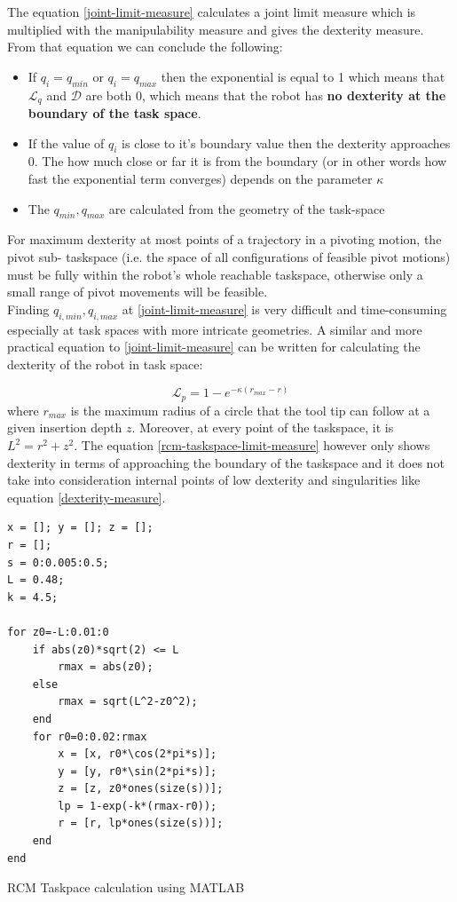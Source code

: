 The equation \ref{joint-limit-measure} calculates a joint limit measure which is multiplied with the manipulability measure and gives the dexterity measure.
From that equation we can conclude the following:
\begin{itemize}
\item If $q_i = q_{min}$ or $q_i = q_{max}$ then the exponential is equal to 1 which means that $\mathcal{L}_{q}$ and $\mathcal{D}$ are both 0, which means 
that the robot has \textbf{no dexterity at the boundary of the task space}.
\item If the value of $q_i$ is close to it's boundary value then the dexterity approaches 0. The how much close or far it is from the boundary (or in other words 
how fast the exponential term converges) depends on the parameter $\kappa$
\item The $q_{min}, q_{max}$ are calculated from the geometry of the task-space
\end{itemize}

For maximum dexterity at most points of a trajectory in a pivoting motion, the pivot sub-
taskspace (i.e. the space of all configurations of feasible pivot motions) must be fully within 
the robot’s whole reachable taskspace, otherwise only a small range of pivot movements will be 
feasible.\\

Finding $q_{i,min}, q_{i,max}$ at \ref{joint-limit-measure} is very difficult and time-consuming especially at task spaces with more intricate geometries. 
A similar and more practical equation to \ref{joint-limit-measure} can be written for calculating the dexterity of the robot in task space:

\begin{equation}
\label{rcm-taskspace-limit-measure}
\mathcal{L}_{p}=1-e^{-\kappa (r_{max} - r)}
\end{equation}
where $r_{max}$ is the maximum radius of a circle that the tool tip can follow at a given insertion depth $z$. Moreover, at every point of the taskspace, it is $L^2 = r^2 + z^2$. 
The equation \ref{rcm-taskspace-limit-measure} however only shows dexterity in terms of approaching the boundary of the taskspace and it does not take into consideration internal points of low 
dexterity and singularities like equation \ref{dexterity-measure}.

\begin{listing}[H]
\begin{verbatim}
x = []; y = []; z = [];
r = [];
s = 0:0.005:0.5;
L = 0.48;
k = 4.5;

for z0=-L:0.01:0
    if abs(z0)*sqrt(2) <= L
        rmax = abs(z0);
    else
        rmax = sqrt(L^2-z0^2);
    end
    for r0=0:0.02:rmax
        x = [x, r0*\cos(2*pi*s)];
        y = [y, r0*\sin(2*pi*s)];
        z = [z, z0*ones(size(s))];
        lp = 1-exp(-k*(rmax-r0));
        r = [r, lp*ones(size(s))];
    end
end
\end{verbatim}
\caption{RCM Taskpace calculation using MATLAB}
\label{code:rcm_taskspace_matlab}
\end{listing}


